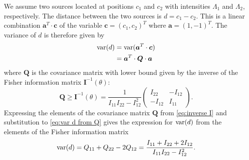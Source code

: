 We assume two sources located at positions $c_1$ and $c_2$ with intensities $\Lambda_1$ and $\Lambda_2$, respectively. The distance between the two sources is $d=c_1-c_2$. This is a linear combination $\bm{a}^{T}\cdot\bm{c}$ of the variable $\bm{c}=(c_1,c_2)^{T}$ where $\bm{a}=(1,-1)^{T}$. The variance of $d$ is therefore given by 
%
\begin{alignat}{1}
	\mathrm{var}(d)
	&=\mathrm{var}(\bm{a}^{T}\cdot\bm{c})\nonumber\\
	&=\bm{a}^{T}\cdot\bm{Q}\cdot\bm{a}
	\label{eq:var d from Q}
\end{alignat}
%
where $\bm{Q}$ is the covariance matrix with lower bound given by the inverse of the Fisher information matrix $\bm{I}^{-1}(\theta)$: 
%
\begin{equation}
	\bm{Q}\geq\bm{I}^{-1}(\theta)=\frac{1}{I_{11}I_{22}-I_{12}^2}\left(
	\begin{array}{cc}
		I_{22} & -I_{12}\\
		-I_{12} & I_{11}
	\end{array}\right).
	\label{eq:inverse I}
\end{equation}
%
Expressing the elements of the covariance matrix $\bm{Q}$ from \autoref{eq:inverse I} and substitution to \autoref{eq:var d from Q} gives the expression for $\mathrm{var}(d)$ from the elements of the Fisher information matrix
%
\begin{equation}
	\mathrm{var}(d)=Q_{11}+Q_{22}-2Q_{12}=\frac{I_{11}+I_{22}+2I_{12}}{I_{11}I_{22}-I_{12}^2}.
	\label{eq:variance d alternative}
\end{equation}

